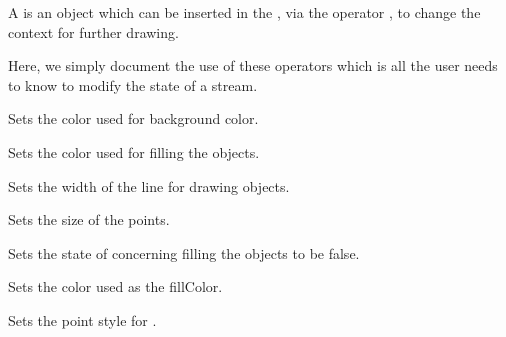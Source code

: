 



A  is an object which can be inserted in the ,
via the operator \ccc{<<}, to change the context for further drawing.

Here, we simply document the use of these operators which is all the
user needs to know to modify the state of a stream.

{Sets the color used for background color.}
\ccGlue

{Sets the color used for filling the objects.}
\ccGlue

{Sets the width of the line for drawing objects.}
\ccGlue

{Sets the size of the points.}
\ccGlue

{Sets the state of  concerning filling the objects to be false.}
\ccGlue

{Sets the color used as the  fillColor.}
\ccGlue

{Sets the point style for .}
\ccGlue
